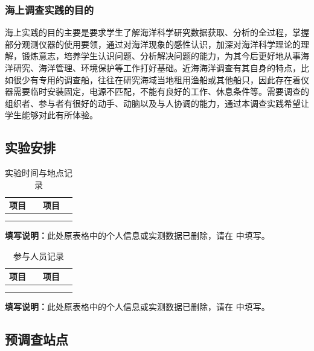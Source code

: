 \documentclass[UTF8,a4paper,12pt]{ctexart}
\begin{document}
\subsubsection{海上调查实践的目的}

海上实践的目的主要是要求学生了解海洋科学研究数据获取、分析的全过程，掌握部分观测仪器的使用要领，通过对海洋现象的感性认识，加深对海洋科学理论的理解，锻炼意志，培养学生认识问题、分析解决问题的能力，为其今后更好地从事海洋研究、海洋管理、环境保护等工作打好基础。近海海洋调查有其自身的特点，比如很少有专用的调查船，往往在研究海域当地租用渔船或其他船只，因此存在着仪器需要临时安装固定，电源不匹配，不能有良好的工作、休息条件等。需要调查的组织者、参与者有很好的动手、动脑以及与人协调的能力，通过本调查实践希望让学生能够对此有所体验。

\subsection{实验安排}


\begin{table}[H]
\centering
\caption{实验时间与地点记录}
\begin{tabularx}{\linewidth}{YYYY}
\toprule
项目 & {} & 项目 & {} \\
\midrule
{} & {} & {} & {} \\
{} & {} & {} & {} \\
\bottomrule
\end{tabularx}
\end{table}
\noindent\textbf{填写说明：}此处原表格中的个人信息或实测数据已删除，请在 {} 中填写。\par



\begin{table}[H]
\centering
\caption{参与人员记录}
\begin{tabularx}{\linewidth}{YYYY}
\toprule
项目 & {} & 项目 & {} \\
\midrule
{} & {} & {} & {} \\
{} & {} & {} & {} \\
\bottomrule
\end{tabularx}
\end{table}
\noindent\textbf{填写说明：}此处原表格中的个人信息或实测数据已删除，请在 {} 中填写。\par


\subsection{预调查站点}
\end{document}
